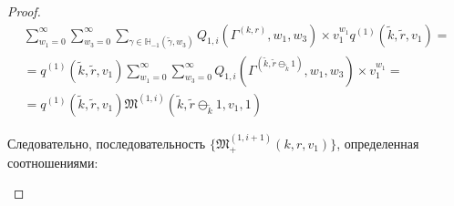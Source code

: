 \documentclass[a4paper,12pt,russian]{extarticle}
\begin{document}
\begin{proof}
\begin{multline*}
 \sum_{w_1=0}^{\infty}\sum_{w_3=0}^{\infty} \sum_{\gamma \in {\mathbb H}_{-1}(\tilde{\gamma},w_3)} Q_{1,i}(\Gamma^{(k,r)},w_1,w_3)  \times  v_1^{w_1} q^{(1)}(\tilde{k},\tilde{r},v_1) = \\ = q^{(1)}(\tilde{k},\tilde{r},v_1)  \sum_{w_1=0}^{\infty}\sum_{w_3=0}^{\infty}  Q_{1,i}(\Gamma^{(\tilde{k},\tilde{r}\ominus_{\tilde{k}} 1)},w_1,w_3)  \times  v_1^{w_1} = \\ =
 q^{(1)}(\tilde{k},\tilde{r},v_1)  \mathfrak{M}^{(1,i)}(\tilde{k},\tilde{r}\ominus_{\tilde{k}} 1,v_1,1)  
\end{multline*}

Следовательно, последовательность $\{\mathfrak{M}_+^{(1,i+1)}(k,r,v_1)\}$, определенная соотношениями:
\begin{enumerate}


\end{enumerate}
\end{proof}
\end{document}
